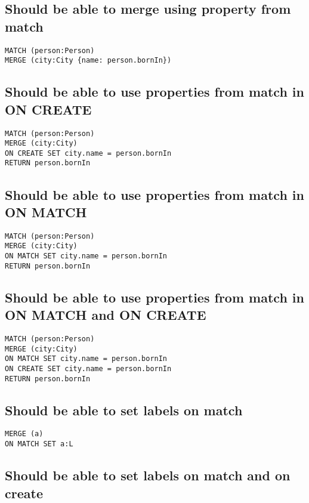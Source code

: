\subsection{Should be able to merge using property from match}

\begin{lstlisting}
MATCH (person:Person)
MERGE (city:City {name: person.bornIn})
\end{lstlisting}

\subsection{Should be able to use properties from match in ON CREATE}

\begin{lstlisting}
MATCH (person:Person)
MERGE (city:City)
ON CREATE SET city.name = person.bornIn
RETURN person.bornIn
\end{lstlisting}

\subsection{Should be able to use properties from match in ON MATCH}

\begin{lstlisting}
MATCH (person:Person)
MERGE (city:City)
ON MATCH SET city.name = person.bornIn
RETURN person.bornIn
\end{lstlisting}

\subsection{Should be able to use properties from match in ON MATCH and ON CREATE}

\begin{lstlisting}
MATCH (person:Person)
MERGE (city:City)
ON MATCH SET city.name = person.bornIn
ON CREATE SET city.name = person.bornIn
RETURN person.bornIn
\end{lstlisting}

\subsection{Should be able to set labels on match}

\begin{lstlisting}
MERGE (a)
ON MATCH SET a:L
\end{lstlisting}

\subsection{Should be able to set labels on match and on create}

